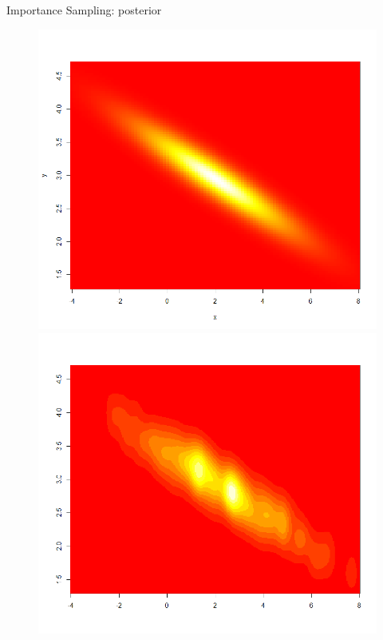  
 \begin{frame}{Importance Sampling: posterior}
 
\begin{figure}
   \begin{minipage}[c]{.46\linewidth}
 \includegraphics[width=\textwidth]{figures/post_2D_true.png}
   \end{minipage} \hfill
   \begin{minipage}[c]{.46\linewidth}
  \includegraphics[width=\textwidth]{figures/post_2D_IS.png}

\end{minipage}
\end{figure}
\end{frame}
